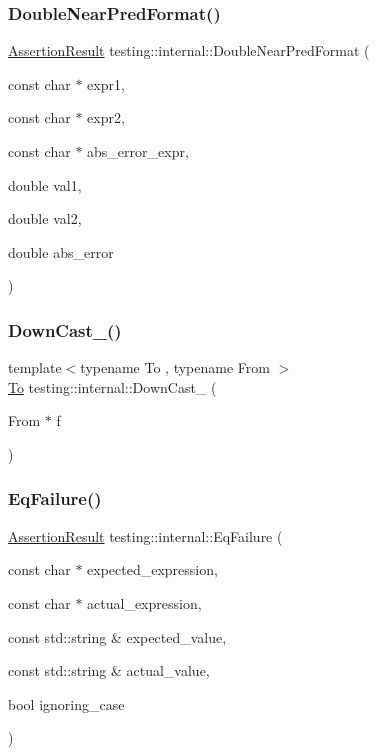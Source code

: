 \subsubsection{\texorpdfstring{Double\+Near\+Pred\+Format()}{DoubleNearPredFormat()}}
{\footnotesize\ttfamily \hyperlink{classtesting_1_1_assertion_result}{Assertion\+Result} testing\+::internal\+::\+Double\+Near\+Pred\+Format (\begin{DoxyParamCaption}\item[{const char $\ast$}]{expr1,  }\item[{const char $\ast$}]{expr2,  }\item[{const char $\ast$}]{abs\+\_\+error\+\_\+expr,  }\item[{double}]{val1,  }\item[{double}]{val2,  }\item[{double}]{abs\+\_\+error }\end{DoxyParamCaption})}

\mbox{\label{namespacetesting_1_1internal_a1a1a1aed3fe00908b8a45d5ab4a33665}} 
\subsubsection{\texorpdfstring{Down\+Cast\+\_\+()}{DownCast\_()}}
{\footnotesize\ttfamily template$<$typename To , typename From $>$ \\
\hyperlink{classtesting_1_1internal_1_1_to}{To} testing\+::internal\+::\+Down\+Cast\+\_\+ (\begin{DoxyParamCaption}\item[{From $\ast$}]{f }\end{DoxyParamCaption})\hspace{0.3cm}{\ttfamily [inline]}}

\mbox{\label{namespacetesting_1_1internal_a08725846ff184d3e79bcf5be4df19157}} 
\subsubsection{\texorpdfstring{Eq\+Failure()}{EqFailure()}}
{\footnotesize\ttfamily \hyperlink{classtesting_1_1_assertion_result}{Assertion\+Result} testing\+::internal\+::\+Eq\+Failure (\begin{DoxyParamCaption}\item[{const char $\ast$}]{expected\+\_\+expression,  }\item[{const char $\ast$}]{actual\+\_\+expression,  }\item[{const std\+::string \&}]{expected\+\_\+value,  }\item[{const std\+::string \&}]{actual\+\_\+value,  }\item[{bool}]{ignoring\+\_\+case }\end{DoxyParamCaption})}


